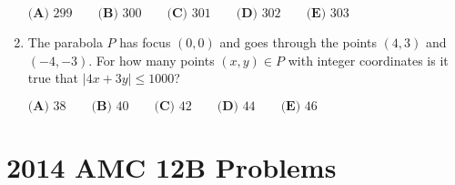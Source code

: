 \documentclass{article}
\begin{document}
\begin{enumerate}[label=\arabic*., itemsep=0.5em]
\(\textbf{(A) }299\qquad
\textbf{(B) }300\qquad
\textbf{(C) }301\qquad
\textbf{(D) }302\qquad
\textbf{(E) }303\qquad\)\par \vspace{0.5em}\item The parabola \(P\) has focus \((0,0)\) and goes through the points \((4,3)\) and \((-4,-3)\).  For how many points \((x,y)\in P\) with integer coordinates is it true that \(|4x+3y|\leq 1000\)?

\(\textbf{(A) }38\qquad
\textbf{(B) }40\qquad
\textbf{(C) }42\qquad
\textbf{(D) }44\qquad
\textbf{(E) }46\qquad\)\par \vspace{0.5em}\end{enumerate}\newpage\section*{2014 AMC 12B Problems}
\end{document}
